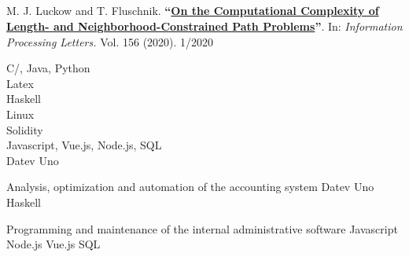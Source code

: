 \documentclass[11pt]{thyv}
\begin{document}
	\begin{mdframed}

		\begin{minipage}[t]{0.50\textwidth} %
			\vspace{-\baselineskip} %

			\\
			\\
				
		\end{minipage}
		\begin{minipage}[t]{0.50\textwidth} 
			\vspace{-\baselineskip} %
			
			\\
			\\
		\end{minipage}


			M. J. Luckow and T. Fluschnik. \textbf{``\href{https://doi.org/10.1016/j.ipl.2019.105913}{On the Computational Complexity of Length- and Neighborhood-Constrained Path Problems}''}. In: \textit{Information Processing Letters.} Vol. 156 (2020). \hfill \textcolor{thyGrey}{1/2020} %
		
			C/\Cplusplus, Java, Python \hfill \ThreeOfFour \\
			Latex \hfill \ThreeOfFour \\
			Haskell \hfill \OneOfFour \\
			Linux \hfill \TwoOfFour \\
			Solidity \hfill \TwoOfFour \\
			Javascript, Vue.js, Node.js, SQL \hfill \TwoOfFour \\
			Datev Uno \hfill \FourOfFour

			{Analysis, optimization and automation of the accounting system}
			{Datev Uno \slashsep Haskell}

			{Programming and maintenance of the internal administrative software}
			{Javascript \slashsep Node.js \slashsep Vue.js \slashsep SQL}


\end{mdframed}
\end{document}
